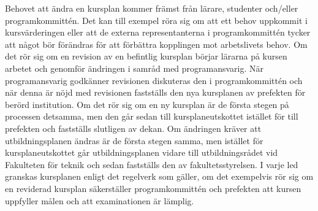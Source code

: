 Behovet att ändra en kursplan kommer främst från lärare, studenter och/eller programkommittén. Det kan till exempel röra sig om att ett behov uppkommit i kursvärderingen eller att de externa representanterna i programkommittén tycker att något bör förändras för att förbättra kopplingen mot arbetslivets behov. Om det rör sig om en revision av en befintlig kursplan börjar lärarna på kursen arbetet och genomför ändringen i samråd med programansvarig. När programansvarig godkänner revisionen diskuteras den i programkommittén och när denna är nöjd med revisionen fastställs den nya kursplanen av prefekten för berörd institution. Om det rör sig om en ny kursplan är de första stegen på processen detsamma, men den går sedan till kursplaneutskottet istället för till prefekten och fastställs slutligen av dekan. Om ändringen kräver att utbildningsplanen ändras är de första stegen samma, men istället för kursplaneutskottet går utbildningsplanen vidare till utbildningsrådet vid Fakulteten för teknik och sedan fastställs den av fakultetsstyrelsen. I varje led granskas kursplanen enligt det regelverk som gäller, om det exempelvis rör sig om en reviderad kursplan säkerställer programkommittén och prefekten att kursen uppfyller målen och att examinationen är lämplig.